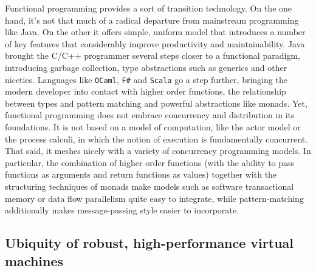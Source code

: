 Functional programming provides a sort of transition technology. On
the one hand, it's not that much of a radical departure from
mainstream programming like Java. On the other it offers simple,
uniform model that introduces a number of key features that
considerably improve productivity and maintainability. Java brought
the C/C++ programmer several steps closer to a functional paradigm,
introducing garbage collection, type abstractions such as generics and
other niceties. Languages like \texttt{OCaml}, \texttt{F\#} and
\texttt{Scala} go a step further, bringing the modern developer into
contact with higher order functions, the relationship between types
and pattern matching and powerful abstractions like monads. Yet,
functional programming does not embrace concurrency and distribution
in its foundations. It is not based on a model of computation, like
the actor model or the process calculi, in which the notion of
execution is fundamentally concurrent. That said, it meshes
nicely with a variety of concurrency programming models. In
particular, the combination of higher order functions (with the
ability to pass functions as arguments and return functions as values)
together with the structuring techniques of monads make models such as
software transactional memory or data flow parallelism quite easy to
integrate, while pattern-matching additionally makes message-passing
style easier to incorporate.

\subsection{Ubiquity of robust, high-performance virtual machines}

